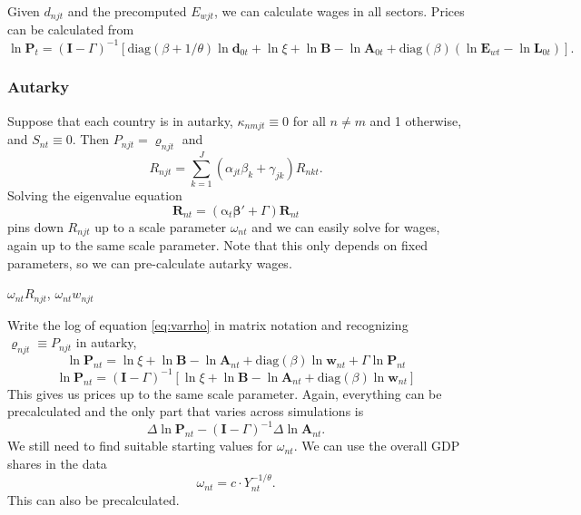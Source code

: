 \documentclass{article}
\begin{document}
Given $d_{njt}$ and the precomputed $E_{wjt}$, we can calculate wages in all sectors. Prices can be calculated from
\[
\ln\mathbf P_{t} = 
(\mathbf I-\Gamma)^{-1}[\text{diag}(\beta+1/\theta) \ln\mathbf d_{0t}  
+\ln\xi
	+ \ln\mathbf B
	- \ln\mathbf A_{0t}
+
\text{diag}(\beta)(\ln\mathbf E_{wt}-\ln\mathbf L_{0t})]
 .  
\]


\subsubsection{Autarky}
Suppose that each country is in autarky, $\kappa_{nmjt}\equiv 0$ for all $n\neq m$ and 1 otherwise, and $S_{nt}\equiv 0$. Then $P_{njt}=\varrho_{njt}$ and 
\begin{equation*}
	R_{njt} = 			
		\sum_{k=1}^J(\alpha_{jt}\beta_k+\gamma_{jk}) R_{nkt}. 
\end{equation*}
Solving the eigenvalue equation
\[
\mathbf R_{nt} = (\mathrm\alpha_t \mathbf \beta'+\Gamma)\mathbf R_{nt}
\]
pins down $R_{njt}$ up to a scale parameter $\omega_{nt}$ and we can easily solve for wages, again up to the same scale parameter. Note that this only depends on fixed parameters, so we can pre-calculate autarky wages.

$\omega_{nt}R_{njt}$, $\omega_{nt}w_{njt}$

Write the log of equation \eqref{eq:varrho} in matrix notation and recognizing $\varrho_{njt}\equiv P_{njt}$ in autarky,
\[
\ln\mathbf P_{nt} = \ln\xi
	+ \ln\mathbf B
	- \ln\mathbf A_{nt}
	+ \text{diag}(\beta) \ln\mathbf w_{nt}
	+ \Gamma \ln\mathbf P_{nt}  
\]
\[
\ln\mathbf P_{nt} = 
(\mathbf I-\Gamma)^{-1}
	[
	\ln\xi
	+ \ln\mathbf B
	- \ln\mathbf A_{nt}
	+ \text{diag}(\beta) \ln\mathbf w_{nt}
	]
\]
This gives us prices up to the same scale parameter. Again, everything can be precalculated and the only part that varies across simulations is
\[
\Delta \ln\mathbf P_{nt}
-(\mathbf I-\Gamma)^{-1}
	\Delta\ln\mathbf A_{nt}.
\]
We still need to find suitable starting values for $\omega_{nt}$. We can use the overall GDP shares in the data 
\[
\omega_{nt} = c\cdot Y_{nt}^{-1/\theta}.
\]
This can also be precalculated.
\end{document}
